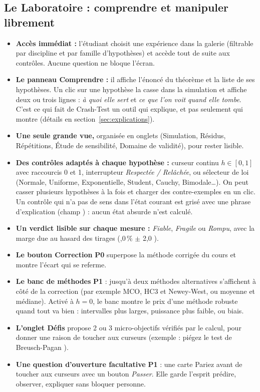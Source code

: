 \documentclass[11pt,a4paper]{article}
\newcommand{\pzero}{\colorbox{ctCorrection!18}{\footnotesize\textbf{P0}}}
\newcommand{\pone}{\colorbox{ctMethod!18}{\footnotesize\textbf{P1}}}
\begin{document}
\subsection{Le Laboratoire : comprendre et manipuler librement}
\begin{itemize}[leftmargin=*]
  \item \textbf{Accès immédiat :} l'étudiant choisit une expérience dans la galerie (filtrable par discipline et par famille d'hypothèses) et accède tout de suite aux contrôles. Aucune question ne bloque l'écran.
  \item \textbf{Le panneau \og Comprendre \fg{} :} il affiche l'énoncé du théorème et la liste de ses hypothèses. Un clic sur une hypothèse la casse dans la simulation et affiche deux ou trois lignes : \emph{à quoi elle sert} et \emph{ce que l'on voit quand elle tombe}. C'est ce qui fait de Crash-Test un outil qui explique, et pas seulement qui montre (détails en section~\ref{sec:explications}).
  \item \textbf{Une seule grande vue,} organisée en onglets (Simulation, Résidus, Répétitions, Étude de sensibilité, Domaine de validité), pour rester lisible.
  \item \textbf{Des contrôles adaptés à chaque hypothèse :} curseur continu $h \in [0,1]$ avec raccourcis 0 et 1, interrupteur \emph{Respectée / Relâchée}, ou sélecteur de loi (Normale, Uniforme, Exponentielle, Student, Cauchy, Bimodale\dots). On peut casser plusieurs hypothèses à la fois et charger des contre-exemples en un clic. Un contrôle qui n'a pas de sens dans l'état courant est grisé avec une phrase d'explication (champ ) : aucun état absurde n'est calculé.
  \item \textbf{Un verdict lisible sur chaque mesure :} \emph{Fiable}, \emph{Fragile} ou \emph{Rompu}, avec la marge due au hasard des tirages (,0\,\% $\pm$ 2,0 \fg{}).
  \item \textbf{Le bouton Correction} \pzero{} superpose la méthode corrigée du cours et montre l'écart qui se referme.
  \item \textbf{Le banc de méthodes} \pone{} : jusqu'à deux méthodes alternatives s'affichent à côté de la correction (par exemple MCO, HC3 et Newey-West, ou moyenne et médiane). Activé à $h = 0$, le banc montre le prix d'une méthode robuste quand tout va bien : intervalles plus larges, puissance plus faible, ou biais.
  \item \textbf{L'onglet Défis} propose 2 ou 3 micro-objectifs vérifiés par le calcul, pour donner une raison de toucher aux curseurs (exemple : \og piégez le test de Breusch-Pagan \fg{}).
  \item \textbf{Une question d'ouverture facultative} \pone{} : une carte \og Pariez avant de toucher aux curseurs \fg{} avec un bouton \emph{Passer}. Elle garde l'esprit \og prédire, observer, expliquer \fg{} sans bloquer personne.
\end{itemize}
\end{document}
